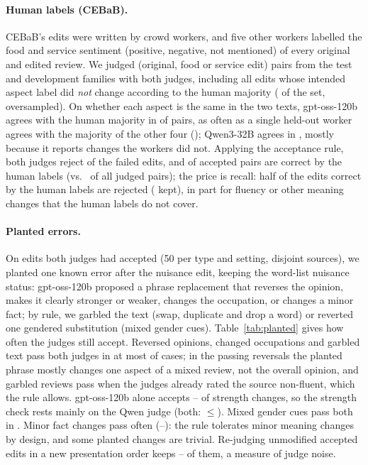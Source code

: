 \paragraph{Human labels (CEBaB).} CEBaB's edits were written by crowd workers, and five other workers labelled the food and service sentiment (positive, negative, not mentioned) of every original and edited review. We judged \jvN{} (original, food or service edit) pairs from the test and development families with both judges, including all \jvNbad{} edits whose intended aspect label did \emph{not} change according to the human majority (\jvBadRate{} of the set, oversampled). On whether each aspect is the same in the two texts, gpt-oss-120b agrees with the human majority in \jvGptQ{} of pairs, as often as a single held-out worker agrees with the majority of the other four (\jvHumanQ); Qwen3-32B agrees in \jvQwenQ, mostly because it reports changes the workers did not. Applying the acceptance rule, both judges reject \jvRejBad{} of the failed edits, and \jvPrec{} of accepted pairs are correct by the human labels (vs.\ \jvGoodRate{} of all judged pairs); the price is recall: half of the edits correct by the human labels are rejected (\jvRecall{} kept), in part for fluency or other meaning changes that the human labels do not cover.

\paragraph{Planted errors.} On edits both judges had accepted (50 per type and setting, disjoint sources), we planted one known error after the nuisance edit, keeping the word-list nuisance status: gpt-oss-120b proposed a phrase replacement that reverses the opinion, makes it clearly stronger or weaker, changes the occupation, or changes a minor fact; by rule, we garbled the text (swap, duplicate and drop a word) or reverted one gendered substitution (mixed gender cues). Table~\ref{tab:planted} gives how often the judges still accept. Reversed opinions, changed occupations and garbled text pass both judges in at most \plBadMax{} of cases; in the passing reversals the planted phrase mostly changes one aspect of a mixed review, not the overall opinion, and garbled reviews pass when the judges already rated the source non-fluent, which the rule allows. gpt-oss-120b alone accepts \plStrGptMin--\plStrGptMax{} of strength changes, so the strength check rests mainly on the Qwen judge (both: $\leq$\plStrBothMax). Mixed gender cues pass both in \plMixBoth. Minor fact changes pass often (\plFactMin--\plFactMax): the rule tolerates minor meaning changes by design, and some planted changes are trivial. Re-judging unmodified accepted edits in a new presentation order keeps \plCleanMin--\plCleanMax{} of them, a measure of judge noise.

